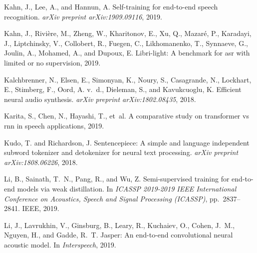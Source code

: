 \documentclass{article}
\begin{document}
\begin{thebibliography}{99}
Kahn, J., Lee, A., and Hannun, A.
\newblock Self-training for end-to-end speech recognition.
\newblock \emph{arXiv preprint arXiv:1909.09116}, 2019{}.

Kahn, J., Rivière, M., Zheng, W., Kharitonov, E., Xu, Q., Mazaré, P.,
  Karadayi, J., Liptchinsky, V., Collobert, R., Fuegen, C., Likhomanenko, T.,
  Synnaeve, G., Joulin, A., Mohamed, A., and Dupoux, E.
\newblock Libri-light: A benchmark for asr with limited or no supervision,
  2019{}.

Kalchbrenner, N., Elsen, E., Simonyan, K., Noury, S., Casagrande, N., Lockhart,
  E., Stimberg, F., Oord, A. v.~d., Dieleman, S., and Kavukcuoglu, K.
\newblock Efficient neural audio synthesis.
\newblock \emph{arXiv preprint arXiv:1802.08435}, 2018.

Karita, S., Chen, N., Hayashi, T., et~al.
\newblock A comparative study on transformer vs rnn in speech applications,
  2019.

Kudo, T. and Richardson, J.
\newblock Sentencepiece: A simple and language independent subword tokenizer
  and detokenizer for neural text processing.
\newblock \emph{arXiv preprint arXiv:1808.06226}, 2018.

Li, B., Sainath, T.~N., Pang, R., and Wu, Z.
\newblock Semi-supervised training for end-to-end models via weak distillation.
\newblock In \emph{ICASSP 2019-2019 IEEE International Conference on Acoustics,
  Speech and Signal Processing (ICASSP)}, pp.\  2837--2841. IEEE,
  2019{}.

Li, J., Lavrukhin, V., Ginsburg, B., Leary, R., Kuchaiev, O., Cohen, J.~M.,
  Nguyen, H., and Gadde, R.~T.
\newblock Jasper: An end-to-end convolutional neural acoustic model.
\newblock In \emph{Interspeech}, 2019{}.


\end{thebibliography}
\end{document}
